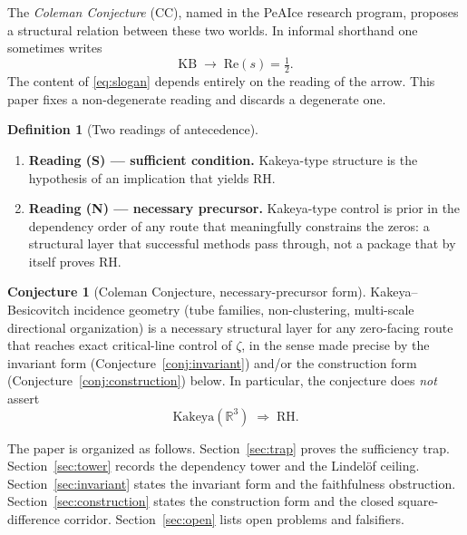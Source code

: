 \documentclass[11pt]{amsart}
\theoremstyle{plain}
\theoremstyle{definition}
\newtheorem{definition}[theorem]{Definition}
\newtheorem{conjecture}[theorem]{Conjecture}
\newcommand{\KB}{\mathrm{KB}}
\newcommand{\RH}{\mathrm{RH}}
\newcommand{\CC}{\mathrm{CC}}
\begin{document}
The \emph{Coleman Conjecture} ($\CC$), named in the PeAIce research program,
proposes a structural relation between these two worlds. In informal shorthand
one sometimes writes
\begin{equation}
  \label{eq:slogan}
  \KB \;\longrightarrow\; \mathrm{Re}(s)=\tfrac12.
\end{equation}
The content of \eqref{eq:slogan} depends entirely on the reading of the arrow.
This paper fixes a non-degenerate reading and discards a degenerate one.

\begin{definition}[Two readings of antecedence]
\label{def:readings}
\begin{enumerate}[label=(\alph*)]
  \item \textbf{Reading (S) --- sufficient condition.}
  Kakeya-type structure is the hypothesis of an implication that yields $\RH$.
  \item \textbf{Reading (N) --- necessary precursor.}
  Kakeya-type control is prior in the dependency order of any route that
  meaningfully constrains the zeros: a structural layer that successful methods
  pass through, not a package that by itself proves $\RH$.
\end{enumerate}
\end{definition}

\begin{conjecture}[Coleman Conjecture, necessary-precursor form]
\label{conj:cc-n}
Kakeya--Besicovitch incidence geometry (tube families, non-clustering, multi-scale
directional organization) is a necessary structural layer for any zero-facing
route that reaches exact critical-line control of $\zeta$, in the sense made
precise by the invariant form (Conjecture~\ref{conj:invariant}) and/or the
construction form (Conjecture~\ref{conj:construction}) below.
In particular, the conjecture does \emph{not} assert
\begin{equation}
  \label{eq:no-S}
  \text{Kakeya}(\mathbb{R}^3)\;\Longrightarrow\;\RH.
\end{equation}
\end{conjecture}

The paper is organized as follows.
Section~\ref{sec:trap} proves the sufficiency trap.
Section~\ref{sec:tower} records the dependency tower and the Lindel\"of ceiling.
Section~\ref{sec:invariant} states the invariant form and the faithfulness
obstruction.
Section~\ref{sec:construction} states the construction form and the closed
square-difference corridor.
Section~\ref{sec:open} lists open problems and falsifiers.
\end{document}
